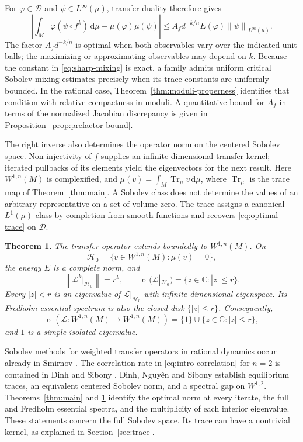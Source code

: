 \documentclass[11pt,reqno]{amsart}
\theoremstyle{plain}
\newtheorem{theorem}{Theorem}[section]
\theoremstyle{definition}
\theoremstyle{remark}
\newcommand{\C}{\mathbb C}
\newcommand{\Lop}{\mathcal L}
\newcommand{\Hcal}{\mathcal H}
\newcommand{\Dcal}{\mathcal D}
\newcommand{\Tr}{\operatorname{Tr}_{\mu}}
\newcommand{\norm}[1]{\left\lVert #1\right\rVert}
\newcommand{\abs}[1]{\left\lvert #1\right\rvert}
\newcommand{\dd}{\mathrm d}
\DeclareMathOperator{\spec}{\sigma}
\numberwithin{equation}{section}
\begin{document}
For $\varphi\in\Dcal$ and $\psi\in L^\infty(\mu)$, transfer duality therefore gives
\begin{equation}\label{eq:intro-correlation}
 \abs{\int_M\varphi(\psi\circ f^k)\,\dd\mu-\mu(\varphi)\mu(\psi)}
 \le A_f d^{-k/n}E(\varphi)\norm{\psi}_{L^\infty(\mu)}.
\end{equation}
The factor $A_f d^{-k/n}$ is optimal when both observables vary over the indicated unit balls; the maximizing or approximating observables may depend on $k$. Because the constant in \eqref{eq:sharp-mixing} is exact, a family admits uniform critical Sobolev mixing estimates precisely when its trace constants are uniformly bounded. In the rational case, Theorem~\ref{thm:moduli-properness} identifies that condition with relative compactness in moduli. A quantitative bound for $A_f$ in terms of the normalized Jacobian discrepancy is given in Proposition~\ref{prop:prefactor-bound}.

The right inverse also determines the operator norm on the centered Sobolev space. Non-injectivity of $f$ supplies an infinite-dimensional transfer kernel; iterated pullbacks of its elements yield the eigenvectors for the next result. Here $W^{1,n}(M)$ is complexified, and $\mu(v)=\int_M\Tr v\,\dd\mu$, where $\Tr$ is the trace map of Theorem~\ref{thm:main}. A Sobolev class does not determine the values of an arbitrary representative on a set of volume zero. The trace assigns a canonical $L^1(\mu)$ class by completion from smooth functions and recovers \eqref{eq:optimal-trace} on $\Dcal$.

\begin{theorem}\label{thm:spectrum-intro}
The transfer operator extends boundedly to $W^{1,n}(M)$. On
\[
 \Hcal_0=\{v\in W^{1,n}(M):\mu(v)=0\},
\]
the energy $E$ is a complete norm, and
\begin{equation}\label{eq:spectrum-intro}
 \norm{\Lop^k|_{\Hcal_0}}=r^k,
 \qquad
 \spec(\Lop|_{\Hcal_0})=\{z\in\C:|z|\le r\}.
\end{equation}
Every $|z|<r$ is an eigenvalue of $\Lop|_{\Hcal_0}$ with infinite-dimensional eigenspace. Its Fredholm essential spectrum is also the closed disk $\{|z|\le r\}$. Consequently,
\[
 \spec(\Lop\colon W^{1,n}(M)\to W^{1,n}(M))
 =\{1\}\cup\{z\in\C:|z|\le r\},
\]
and $1$ is a simple isolated eigenvalue.
\end{theorem}

Sobolev methods for weighted transfer operators in rational dynamics occur already in Smirnov \cite[Chapter 2, Section 3]{Smi96}. The correlation rate in \eqref{eq:intro-correlation} for $n=2$ is contained in Dinh and Sibony \cite[Theorem 6.1]{DS06}. Dinh, Nguy\^en and Sibony \cite[Sections 2 and 3]{DNS07} establish equilibrium traces, an equivalent centered Sobolev norm, and a spectral gap on $W^{1,2}$. Theorems~\ref{thm:main} and \ref{thm:spectrum-intro} identify the optimal norm at every iterate, the full and Fredholm essential spectra, and the multiplicity of each interior eigenvalue. These statements concern the full Sobolev space. Its trace can have a nontrivial kernel, as explained in Section~\ref{sec:trace}.
\end{document}
